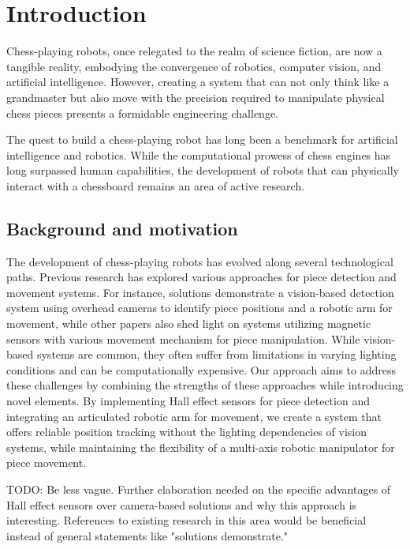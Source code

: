 
\chapter{Introduction}
\label{chap:intro}

Chess-playing robots, once relegated to the realm of science fiction, are now a tangible reality, embodying the convergence of robotics, computer vision, and artificial intelligence. However, creating a system that can not only think like a grandmaster but also move with the precision required to manipulate physical chess pieces presents a formidable engineering challenge.

The quest to build a chess-playing robot has long been a benchmark for artificial intelligence and robotics. While the computational prowess of chess engines has long surpassed human capabilities, the development of robots that can physically interact with a chessboard remains an area of active research.

\section{Background and motivation}
\label{sec:background-motivation}

The development of chess-playing robots has evolved along several technological paths. Previous research has explored various approaches for piece detection and movement systems. For instance, solutions demonstrate a vision-based detection system using overhead cameras to identify piece positions and a robotic arm for movement, while other papers also shed light on systems utilizing magnetic sensors with various movement mechanism for piece manipulation. While vision-based systems are common, they often suffer from limitations in varying lighting conditions and can be computationally expensive. Our approach aims to address these challenges by combining the strengths of these approaches while introducing novel elements. By implementing Hall effect sensors for piece detection and integrating an articulated robotic arm for movement, we create a system that offers reliable position tracking without the lighting dependencies of vision systems, while maintaining the flexibility of a multi-axis robotic manipulator for piece movement.

TODO: Be less vague. Further elaboration needed on the specific advantages of Hall effect sensors over camera-based solutions and why this approach is interesting. References to existing research in this area would be beneficial instead of general statements like "solutions demonstrate."

